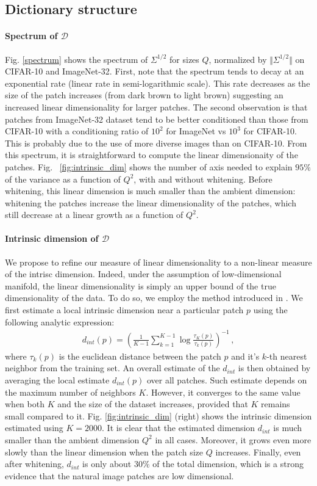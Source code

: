 \documentclass{article}
\begin{document}
\subsection{Dictionary structure}
\label{structure}
\paragraph{Spectrum of $\mathcal{D}$}
Fig. \ref{spectrum} shows the spectrum of $\Sigma^{1/2}$ for  sizes $Q$, normalized by $\Vert \Sigma^{1/2}\Vert$ on CIFAR-10 and ImageNet-32.  First, note that the spectrum tends to decay at an exponential rate (linear rate in semi-logarithmic scale). This rate decreases as the size of the patch increases (from dark brown to light brown) suggesting an increased linear dimensionality for larger patches. The second observation is that patches from ImageNet-32 dataset tend to be better conditioned than those from CIFAR-10 with a conditioning ratio of $10^2$ for ImageNet vs $10^3$ for CIFAR-10. This is probably due to the use of more diverse images than on CIFAR-10. From this spectrum, it is straightforward to compute the linear dimensionaity of the patches. Fig.
~\ref{fig:intrinsic_dim} shows the number of axis needed to explain $95\%$ of the variance as a function of $Q^2$, with and without whitening. Before whitening, this linear dimension is much smaller than the ambient dimension: whitening the patches increase the linear dimensionality of the patches, which still decrease at a linear growth as a function of $Q^2$.

\paragraph{Intrinsic dimension of $\mathcal{D}$}
We propose to refine our measure of linear dimensionality to a non-linear measure of the intrisc dimension. Indeed, under the assumption of low-dimensional manifold, the linear dimensionality is simply an upper bound of the true dimensionality of the data. To do so, we employ the method introduced in \citep{Levina:2004}. We first estimate a local intrinsic dimension near a particular patch $p$ using the following analytic expression:
\begin{align}
	d_{int}(p) = \left( \frac{1}{K-1} \sum_{k=1}^{K-1}\log \frac{\tau_K(p)}{\tau_k(p)} \right)^{-1} \, ,
\end{align}
where $\tau_k(p)$ is the euclidean distance between the patch $p$ and it's $k$-th nearest neighbor from the training set. 
An overall estimate of the $d_{int}$ is then obtained by averaging the local estimate $d_{int}(p)$ over all patches. Such estimate depends on the maximum number of neighbors $K$. However, it converges to the same value when both $K$ and the size of the dataset  increases, provided that $K$ remains small compared to it. Fig. \ref{fig:intrinsic_dim} (right) shows the intrinsic dimension estimated using $K=2000$. It is clear that the estimated dimension $d_{int}$ is much smaller than the ambient dimension $Q
^2$ in all cases. Moreover, it grows even more slowly than the linear dimension when the patch size $Q$ increases. Finally, even after whitening, $d_{int}$ is only about $30\%$ of the total dimension, which is a strong evidence that the natural image patches are low dimensional.    
\end{document}
